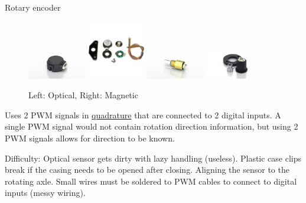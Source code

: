 \documentclass{beamer}
\begin{document}
\begin{frame}[shrink]{Rotary encoder}
\begin{figure}[width=\textwidth]
\includegraphics[width=1in]{OpticalEncoder}
\includegraphics[width=1in]{OpticalEncoder2}
\includegraphics[width=1in]{MagneticEncoder}
\includegraphics[width=1in]{MagneticEncoder2}
\caption{Left: Optical, Right: Magnetic}
\end{figure}

Uses 2 PWM signals in \underline{quadrature} that are connected to 2 digital 
inputs.  A single PWM signal would not contain rotation direction information, 
but using 2 PWM signals allows for direction to be known.

Difficulty: Optical sensor gets dirty with lazy handling (useless).  Plastic 
case clips break if the casing needs to be opened after closing.  Aligning the 
sensor to the rotating axle.  Small wires must be soldered to PWM cables 
to connect to digital inputs (messy wiring).
\end{frame}
\end{document}
